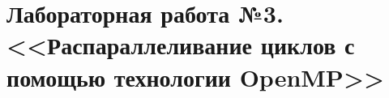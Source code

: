 \section{Лабораторная работа №3. <<Распараллеливание циклов с помощью технологии OpenMP>>}
\label{sec:lab3-openmp}




